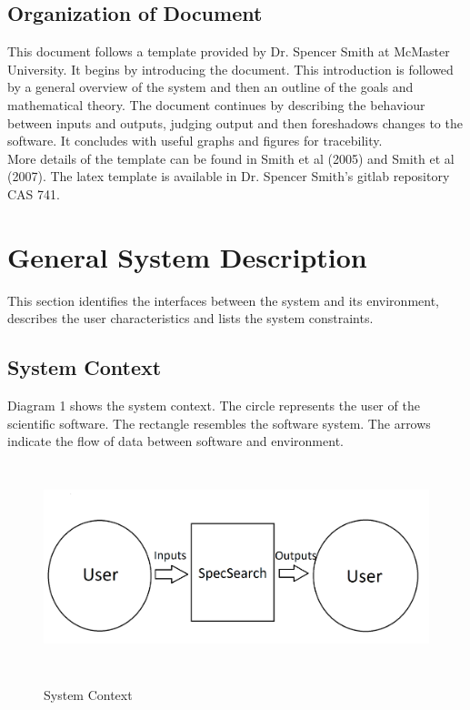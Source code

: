 \documentclass[12pt]{article}
\begin{document}
\subsection{Organization of Document}

This document follows a template provided by Dr. Spencer Smith at McMaster 
University. It begins by introducing the document. This introduction is 
followed by a general overview of the system and then an outline of the goals 
and mathematical theory. The document continues by describing the behaviour 
between inputs 
and outputs, judging output and then foreshadows changes to the software. It 
concludes with useful graphs and figures for tracebility. \\ 

More details of the template can be found in Smith et al (2005) and Smith et al 
(2007). The latex template is available in Dr. Spencer Smith's gitlab 
repository CAS 741. 

\section{General System Description}

This section identifies the interfaces between the system and its environment,
describes the user characteristics and lists the system constraints.

\subsection{System Context} 
Diagram 1 shows the system context. The circle represents the user of the 
scientific software. The rectangle resembles the software system. The arrows 
indicate the flow of data between software and environment. 
 \begin{figure}[h!]
	\begin{center}
		{
			\includegraphics[width=15cm,height=6cm]{SystemContext.png}
		} 
	\caption{System Context}
	\end{center}
 \end{figure}
\end{document}

